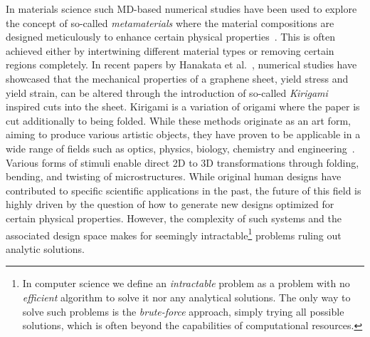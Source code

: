 In materials science such \acrshort{MD}-based numerical studies have been used
to explore the concept of so-called \textit{metamaterials} where the material
compositions are designed meticulously to enhance certain physical properties~\mbox{\cite{PhysRevLett.121.255304, PhysRevResearch.2.042006, graphene/hBN, Mao, Yang, Forte}}. This is often achieved either by intertwining different material types or removing certain regions completely. In recent papers by Hanakata et al.~\cite{PhysRevLett.121.255304, PhysRevResearch.2.042006},
numerical studies have showcased that the mechanical properties of a graphene
sheet, yield stress and yield strain, can be altered through the introduction of
so-called \textit{Kirigami} inspired cuts into the sheet. Kirigami is a
variation of origami where the paper is cut additionally to being folded. While
these methods originate as an art form, aiming to produce various artistic
objects, they have proven to be applicable in a wide range of fields such as
optics, physics, biology, chemistry and engineering~\cite{chen_kirigamiorigami_2020}. Various forms of stimuli enable direct 2D to
3D transformations through folding, bending, and twisting of microstructures.
While original human designs have contributed to specific scientific
applications in the past, the future of this field is highly driven by the
question of how to generate new designs optimized for certain physical
properties. However, the complexity of such systems and the associated design
space makes for seemingly intractable\footnote{In computer science we define an \textit{intractable} problem as a problem with no \textit{efficient} algorithm to solve it nor any analytical solutions. The only way to solve such problems is the \textit{brute-force} approach, simply trying all possible solutions, which is often beyond the capabilities of computational resources.} problems ruling out analytic solutions.

